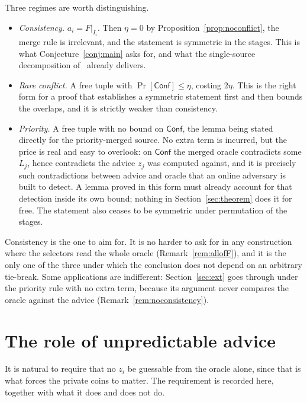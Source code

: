 \documentclass{conjura-conjecture}
\newcommand{\Prob}[1]{\Pr\!\left[#1\right]}
\begin{document}
\begin{remark}\label{rem:rules}
Three regimes are worth distinguishing.
\begin{itemize}
\item \emph{Consistency.} $a_i = F|_{I_i}$. Then $\eta = 0$ by
  Proposition~\ref{prop:noconflict}, the merge rule is irrelevant, and the
  statement is symmetric in the stages. This is what
  Conjecture~\ref{conj:main} asks for, and what the single-source
  decomposition of~\cite{CDGS} already delivers.
\item \emph{Rare conflict.} A free tuple with $\Prob{\mathsf{Conf}} \le
  \eta$, costing $2\eta$. This is the right form for a proof that
  establishes a symmetric statement first and then bounds the overlaps,
  and it is strictly weaker than consistency.
\item \emph{Priority.} A free tuple with no bound on $\mathsf{Conf}$, the
  lemma being stated directly for the priority-merged source. No extra
  term is incurred, but the price is real and easy to overlook: on
  $\mathsf{Conf}$ the merged oracle contradicts some $L_j$, hence
  contradicts the advice $z_j$ was computed against, and it is precisely
  such contradictions between advice and oracle that an online adversary
  is built to detect. A lemma proved in this form must already account for
  that detection inside its own bound; nothing in
  Section~\ref{sec:theorem} does it for free. The statement also ceases to
  be symmetric under permutation of the stages.
\end{itemize}
Consistency is the one to aim for. It is no harder to ask for in any
construction where the selectors read the whole oracle
(Remark~\ref{rem:allofF}), and it is the only one of the three under which
the conclusion does not depend on an arbitrary tie-break. Some
applications are indifferent: Section~\ref{sec:ext} goes through under the
priority rule with no extra term, because its argument never compares the
oracle against the advice (Remark~\ref{rem:noconsistency}).
\end{remark}

\section{The role of unpredictable advice}\label{sec:unpred}

It is natural to require that no $z_i$ be guessable from the oracle alone,
since that is what forces the private coins to matter. The requirement is
recorded here, together with what it does and does not do.
\end{document}
